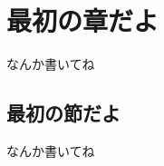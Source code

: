\documentclass[index]{subfiles}
\begin{document}
\chapter{最初の章だよ}
\label{ch:first}

なんか書いてね

\section{最初の節だよ}
\label{sec:first_first}

なんか書いてね
\end{document}
